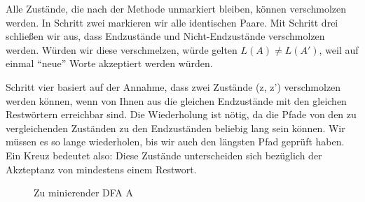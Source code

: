 Alle Zustände, die nach der Methode unmarkiert bleiben,
können verschmolzen werden.
In Schritt zwei markieren wir alle identischen Paare.
Mit Schritt drei schließen wir aus,
dass Endzustände und Nicht-Endzustände verschmolzen werden. 
Würden wir diese verschmelzen,
würde gelten $L(A) \neq L(A')$,
weil auf einmal ``neue'' Worte akzeptiert werden würden.

Schritt vier basiert auf der Annahme, dass zwei Zustände (z, z') verschmolzen werden können,
wenn von Ihnen aus die gleichen Endzustände mit den gleichen Restwörtern erreichbar sind.
Die Wiederholung ist nötig,
da die Pfade von den zu vergleichenden Zuständen zu den Endzuständen
beliebig lang sein können.
Wir müssen es so lange wiederholen, bis wir auch den längsten Pfad geprüft haben.
Ein Kreuz bedeutet also:
Diese Zustände unterscheiden sich bezüglich der Akzteptanz von mindestens einem Restwort.

\begin{figure}[ht] %
\centering %
\caption{Zu minierender DFA A}
\label{fig:dfazumin}
\end{figure}

